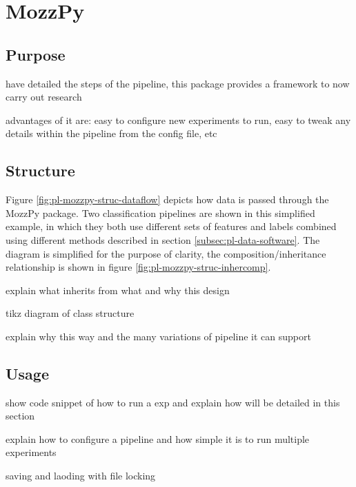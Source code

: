 \section{MozzPy}
\label{sec:pl-mozzpy}
    
    \subsection{Purpose}
    \label{subsec:pl-mozzpy-purp}
        \begin{sitemize}
            \item{have detailed the steps of the pipeline, this package provides a framework to now carry out research}
            \item{advantages of it are: easy to configure new experiments to run, easy to tweak any details within the pipeline from the config file, etc}
        \end{sitemize}
    
    \subsection{Structure}
    \label{subsec:pl-mozzpy-struc}
        
        
        Figure \ref{fig:pl-mozzpy-struc-dataflow} depicts how data is passed through the MozzPy package. Two classification pipelines are shown in this simplified example, in which they both use different sets of features and labels combined using different methods described in section \ref{subsec:pl-data-software}. The diagram is simplified for the purpose of clarity, the composition/inheritance relationship is shown in figure \ref{fig:pl-mozzpy-struc-inhercomp}.
        
        
        
        explain what inherits from what and why this design
    
        \begin{sitemize}
            \item{tikz diagram of class structure}
            \item{explain why this way and the many variations of pipeline it can support}
        \end{sitemize}
    
    \subsection{Usage}
    \label{subsec:pl-mozzpy-usage}
        \begin{sitemize}
            \item{show code snippet of how to run a exp and explain how will be detailed in this section}
            \item{explain how to configure a pipeline and how simple it is to run multiple experiments}
            \item{saving and laoding with file locking}
        \end{sitemize}
   

